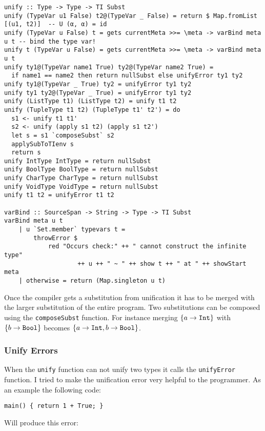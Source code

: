 \documentclass{report}
\begin{document}
\begin{verbatim}
unify :: Type -> Type -> TI Subst 
unify (TypeVar u1 False) t2@(TypeVar _ False) = return $ Map.fromList [(u1, t2)]  -- U (α, α) = id
unify (TypeVar u False) t = gets currentMeta >>= \meta -> varBind meta u t -- bind the type var!
unify t (TypeVar u False) = gets currentMeta >>= \meta -> varBind meta u t
unify ty1@(TypeVar name1 True) ty2@(TypeVar name2 True) = 
  if name1 == name2 then return nullSubst else unifyError ty1 ty2
unify ty1@(TypeVar _ True) ty2 = unifyError ty1 ty2
unify ty1 ty2@(TypeVar _ True) = unifyError ty1 ty2
unify (ListType t1) (ListType t2) = unify t1 t2
unify (TupleType t1 t2) (TupleType t1' t2') = do
  s1 <- unify t1 t1'
  s2 <- unify (apply s1 t2) (apply s1 t2')
  let s = s1 `composeSubst` s2
  applySubToTIenv s
  return s
unify IntType IntType = return nullSubst
unify BoolType BoolType = return nullSubst
unify CharType CharType = return nullSubst
unify VoidType VoidType = return nullSubst
unify t1 t2 = unifyError t1 t2 

varBind :: SourceSpan -> String -> Type -> TI Subst
varBind meta u t
    | u `Set.member` typevars t =
        throwError $
            red "Occurs check:" ++ " cannot construct the infinite type" 
                    ++ u ++ " ~ " ++ show t ++ " at " ++ showStart meta
    | otherwise = return (Map.singleton u t)
\end{verbatim}


Once the compiler gets a substitution from unification it has to be merged with the larger substitution of the entire program. Two substitutions can be composed using the \texttt{composeSubst} function. For instance merging $\{a \rightarrow \text{\texttt{Int}}\}$ with $\{b \rightarrow \text{\texttt{Bool}}\}$ becomes $\{a \rightarrow \text{\texttt{Int}}, b \rightarrow \text{\texttt{Bool}}\}$. 

\subsubsection{Unify Errors}

When the \texttt{unify} function can not unify two types it calls the \texttt{unifyError} function. I tried to make the unification error very helpful to the programmer. As an example the following code:

\begin{lstlisting}[style=SPL]
   main() { return 1 + True; } 
\end{lstlisting}

\noindent Will produce this error:\\
\end{document}
